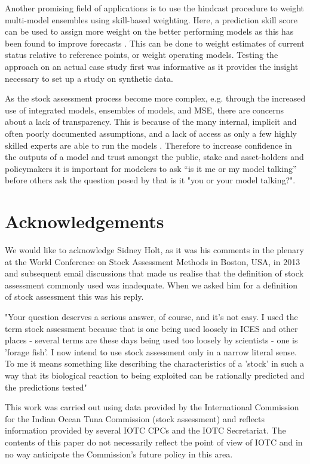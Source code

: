 \documentclass[12pt,halfline,a4paper,nonumbib]{ouparticle}
\begin{document}
Another promising field of applications is to use the hindcast procedure to weight multi-model ensembles using skill-based weighting. Here, a prediction skill score can be used to assign more weight on the better performing models as this has been found to improve forecasts \parencite[e.g.][]{casanova2009weighting}. This can be done to weight estimates of current status relative to reference points, or weight operating models. Testing the approach on an actual case study first was informative as it provides the insight necessary to set up a study on synthetic data.

As the stock assessment process become more complex, e.g. through the increased use of integrated models, ensembles of models, and MSE, there are concerns about a lack of transparency. This is because of the many internal, implicit and often poorly documented assumptions, and a lack of access as only a few highly skilled experts are able to run the models \parencite{hilborn2003state}. Therefore to increase confidence in the outputs of a model and trust amongst the public, stake and asset-holders and policymakers it is important for modelers to ask “is it me or my model talking” before others ask the question posed by \cite{hodges1992you} that is it "you or your model talking?".

\section{Acknowledgements}

We would like to acknowledge Sidney Holt, as it was his comments in the plenary at the World Conference on Stock Assessment Methods in Boston, USA, in 2013 and subsequent email discussions that made us realise that the definition of stock assessment commonly used was inadequate. When we asked him for a definition of stock assessment this was his reply.

"Your question deserves a serious answer, of course, and it's not easy. I used the term stock assessment because that is one being used loosely in ICES and other places - several terms are these days being used too loosely by scientists - one is 'forage fish'. I now intend to use stock assessment only in a narrow literal sense. To me it means something like describing the characteristics of a 'stock' in such a way that its biological reaction to being exploited can be rationally predicted and the predictions tested"

This work was carried out using data provided by the International Commission for the Indian  Ocean  Tuna  Commission  (stock assessment)  and  reflects  information  provided  by  several IOTC CPCs and the IOTC Secretariat.  The contents of this paper do not necessarily reflect the point of view of IOTC and in no way anticipate the Commission's future policy in this area.
\end{document}
